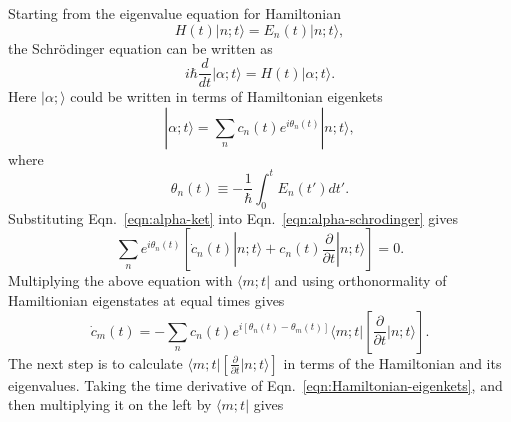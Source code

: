 Starting from the eigenvalue equation for Hamiltonian
%
\begin{equation}
\label{eqn:Hamiltonian-eigenkets}
H(t)  |n;t\rangle = E_n(t) |n;t\rangle ,
\end{equation}
the Schr\"{o}dinger equation can be written as
%
\begin{equation}
\label{eqn:alpha-schrodinger}
i \hbar \frac{d}{dt} |\alpha ; t \rangle = H(t) |\alpha ; t\rangle .
\end{equation}
%
Here $|\alpha;\rangle$ could be written in terms of Hamiltonian eigenkets
%
\begin{equation}
\label{eqn:alpha-ket}
|\alpha;t\rangle=\sum_n c_n(t) e^{i \theta_n(t)} |n;t\rangle ,
\end{equation}
%
where
%
\begin{equation}
\theta_n(t)\equiv-\frac{1}{\hbar} \int_0^t E_n(t') dt'.
\end{equation}
%
Substituting Eqn.~\ref{eqn:alpha-ket} into
Eqn.~\ref{eqn:alpha-schrodinger} gives
%
\begin{equation}
\sum_n e^{i \theta_n(t)} \left[ \dot{c}_n(t) |n;t \rangle +c_n(t) \frac{\partial}{\partial t} |n;t \rangle \right]=0.
\end{equation}
%
Multiplying the above equation with $\langle m;t|$ and using
orthonormality of Hamiltionian eigenstates at equal times gives
%
\begin{equation}
  \label{eqn:cmdot}
\dot{c}_m(t)=-\sum_n c_n(t)e^{i \left[ \theta_n(t)-\theta_m(t)\right]} \langle m;t| \left[ \frac{\partial}{\partial t} |n;t \rangle \right] .
\end{equation}
%
The next step is to calculate
$\langle m;t| \left[ \frac{\partial}{\partial t} |n;t \rangle \right]$
in terms of the Hamiltonian and its eigenvalues. Taking the time
derivative of Eqn.~\ref{eqn:Hamiltonian-eigenkets}, and then
multiplying it on the left by $\langle m;t|$ gives

